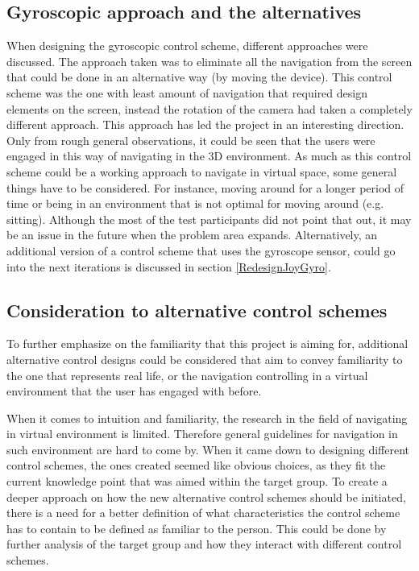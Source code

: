 \subsection*{Gyroscopic approach and the alternatives}
When designing the gyroscopic control scheme, different approaches were discussed. The approach taken was to eliminate all the navigation from the screen that could be done in an alternative way (by moving the device). This control scheme was the one with least amount of navigation that required design elements on the screen, instead the rotation of the camera had taken a completely different approach. This approach has led the project in an interesting direction. Only from rough general observations, it could be seen that the users were engaged in this way of navigating in the 3D environment.
As much as this control scheme could be a working approach to navigate in virtual space, some general things have to be considered. For instance, moving around for a longer period of time or being in an environment that is not optimal for moving around (e.g. sitting). Although the most of the test participants did not point that out, it may be an issue in the future when the problem area expands.
Alternatively, an additional version of a control scheme that uses the gyroscope sensor, could go into the next iterations is discussed in section \ref{RedesignJoyGyro}.

\subsection*{Consideration to alternative control schemes}
To further emphasize on the familiarity that this project is aiming for, additional alternative control designs could be considered that aim to convey familiarity to the one that represents real life, or the navigation controlling in a virtual environment that the user has engaged with before.

When it comes to intuition and familiarity, the research in the field of navigating in virtual environment is limited. Therefore general guidelines for navigation in such environment are hard to come by. When it came down to designing different control schemes, the ones created seemed like obvious choices, as they fit the current knowledge point that was aimed within the target group. To create a deeper approach on how the new alternative control schemes should be initiated, there is a need for a better definition of what characteristics the control scheme has to contain to be defined as familiar to the person. This could be done by further analysis of the target group and how they interact with different control schemes.

